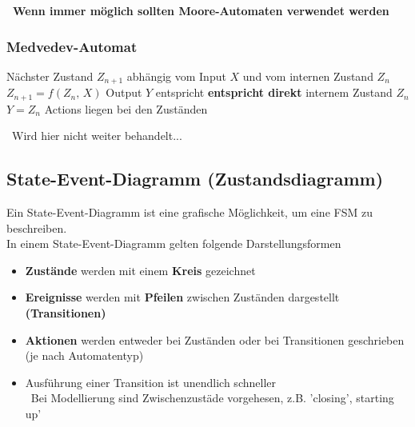 \vspace{0.1cm}

\textbf{ \textrightarrow\ Wenn immer möglich sollten Moore-Automaten verwendet werden}

\subsubsection{Medvedev-Automat}

\begin{outline}
    \1 Nächster Zustand $Z_{n+1}$ abhängig vom Input $X$ und vom internen Zustand $Z_n$
        \2 $Z_{n+1} = f(Z_n, \, X)$
    \1 Output $Y$ entspricht \textbf{entspricht direkt} internem Zustand $Z_n$ 
        \2 $Y = Z_n$
    \1 Actions liegen bei den Zuständen
\end{outline}

\vspace{0.1cm}

\textrightarrow\ Wird hier nicht weiter behandelt...


\subsection{State-Event-Diagramm (Zustandsdiagramm)}

Ein State-Event-Diagramm ist eine grafische Möglichkeit, um eine FSM zu beschreiben. \\
In einem State-Event-Diagramm gelten folgende Darstellungsformen    %

\vspace{0.1cm}

\begin{itemize}
    \item \textbf{Zustände} werden mit einem \textbf{Kreis} gezeichnet
    \item \textbf{Ereignisse} werden mit \textbf{Pfeilen} zwischen Zuständen dargestellt \textbf{(Transitionen)}
    \item \textbf{Aktionen} werden entweder bei Zuständen oder bei Transitionen geschrieben (je nach Automatentyp)
    \item Ausführung einer Transition ist unendlich schneller \\
        \textrightarrow\ Bei Modellierung sind Zwischenzustäde vorgehesen, z.B. 'closing', starting up'
\end{itemize}



